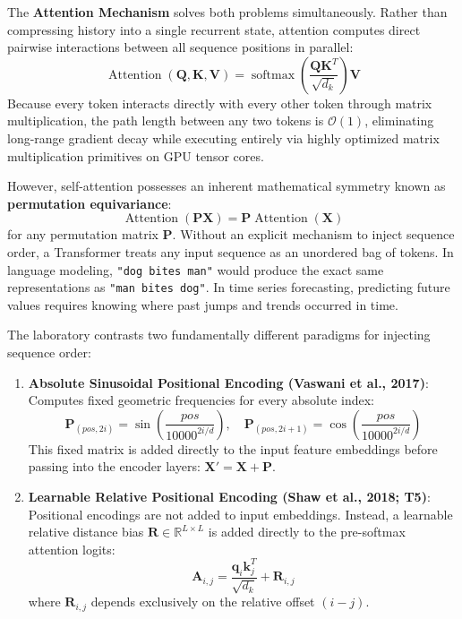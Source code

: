\documentclass[11pt,a4paper]{article}
\begin{document}
The \textbf{Attention Mechanism} solves both problems simultaneously. Rather than compressing history into a single recurrent state, attention computes direct pairwise interactions between all sequence positions in parallel:
\begin{equation}
\operatorname{Attention}(\mathbf{Q}, \mathbf{K}, \mathbf{V}) = \operatorname{softmax}\left(\frac{\mathbf{Q}\mathbf{K}^T}{\sqrt{d_k}}\right)\mathbf{V}
\end{equation}
Because every token interacts directly with every other token through matrix multiplication, the path length between any two tokens is $\mathcal{O}(1)$, eliminating long-range gradient decay while executing entirely via highly optimized matrix multiplication primitives on GPU tensor cores.

However, self-attention possesses an inherent mathematical symmetry known as \textbf{permutation equivariance}:
\begin{equation}
\operatorname{Attention}(\mathbf{P}\mathbf{X}) = \mathbf{P}\operatorname{Attention}(\mathbf{X})
\end{equation}
for any permutation matrix $\mathbf{P}$. Without an explicit mechanism to inject sequence order, a Transformer treats any input sequence as an unordered bag of tokens. In language modeling, \texttt{"dog bites man"} would produce the exact same representations as \texttt{"man bites dog"}. In time series forecasting, predicting future values requires knowing where past jumps and trends occurred in time.

The laboratory contrasts two fundamentally different paradigms for injecting sequence order:
\begin{enumerate}
    \item \textbf{Absolute Sinusoidal Positional Encoding (Vaswani et al., 2017)}: Computes fixed geometric frequencies for every absolute index:
    \begin{equation}
    \mathbf{P}_{(pos, 2i)} = \sin\left(\frac{pos}{10000^{2i/d}}\right), \quad \mathbf{P}_{(pos, 2i+1)} = \cos\left(\frac{pos}{10000^{2i/d}}\right)
    \end{equation}
    This fixed matrix is added directly to the input feature embeddings before passing into the encoder layers: $\mathbf{X}' = \mathbf{X} + \mathbf{P}$.
    \item \textbf{Learnable Relative Positional Encoding (Shaw et al., 2018; T5)}: Positional encodings are not added to input embeddings. Instead, a learnable relative distance bias $\mathbf{R} \in \mathbb{R}^{L \times L}$ is added directly to the pre-softmax attention logits:
    \begin{equation}
    \mathbf{A}_{i, j} = \frac{\mathbf{q}_i \mathbf{k}_j^T}{\sqrt{d_k}} + \mathbf{R}_{i, j}
    \end{equation}
    where $\mathbf{R}_{i, j}$ depends exclusively on the relative offset $(i - j)$.
\end{enumerate}
\end{document}
